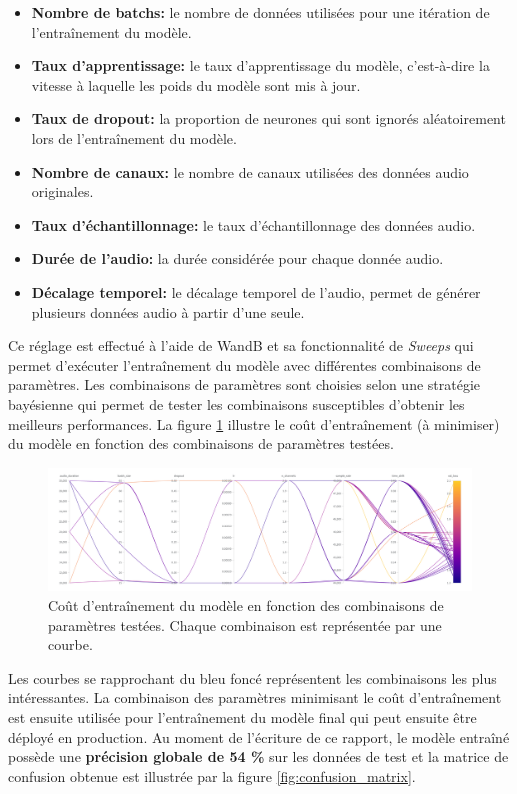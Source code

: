 \begin{itemize}
    \item \textbf{Nombre de batchs:} le nombre de données utilisées pour une itération de l'entraînement du modèle.
    \item \textbf{Taux d'apprentissage:} le taux d'apprentissage du modèle, c'est-à-dire la vitesse à laquelle les poids du modèle sont mis à jour.
    \item \textbf{Taux de dropout:} la proportion de neurones qui sont ignorés aléatoirement lors de l'entraînement du modèle.
    \item \textbf{Nombre de canaux:} le nombre de canaux utilisées des données audio originales.
    \item \textbf{Taux d'échantillonnage:} le taux d'échantillonnage des données audio.
    \item \textbf{Durée de l'audio:} la durée considérée pour chaque donnée audio.
    \item \textbf{Décalage temporel:} le décalage temporel de l'audio, permet de générer plusieurs données audio à partir d'une seule.
\end{itemize}

Ce réglage est effectué à l'aide de WandB et sa fonctionnalité de \textit{Sweeps} qui permet d'exécuter l'entraînement du modèle avec différentes combinaisons de paramètres. Les combinaisons de paramètres sont choisies selon une stratégie bayésienne qui permet de tester les combinaisons susceptibles d'obtenir les meilleurs performances. La figure \ref{fig:hyperparameters} illustre le coût d'entraînement (à minimiser) du modèle en fonction des combinaisons de paramètres testées.

\begin{figure}[H]
    \centering
    \includegraphics[width=\textwidth]{rsc/sweeps.png}
    \caption{Coût d'entraînement du modèle en fonction des combinaisons de paramètres testées. Chaque combinaison est représentée par une courbe.}
    \label{fig:hyperparameters}
\end{figure}

Les courbes se rapprochant du bleu foncé représentent les combinaisons les plus intéressantes. La combinaison des paramètres minimisant le coût d'entraînement est ensuite utilisée pour l'entraînement du modèle final qui peut ensuite être déployé en production. Au moment de l'écriture de ce rapport, le modèle entraîné possède une \textbf{précision globale de 54 \%} sur les données de test et la matrice de confusion obtenue est illustrée par la figure \ref{fig:confusion_matrix}.

